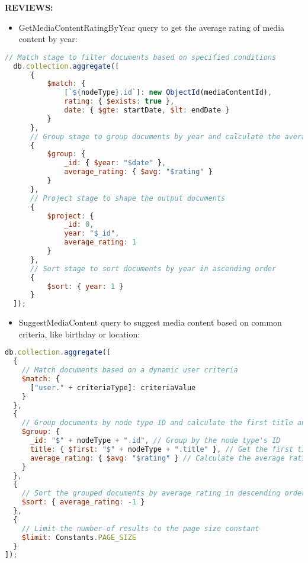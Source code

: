 \textbf{REVIEWS:}

\begin{itemize}
\item GetMediaContentRatingByYear query to get the average rating of media content by year:
\end{itemize}


\begin{lstlisting}[language=JavaScript, caption=GetMediaContentRatingByYear]
  // Match stage to filter documents based on specified conditions
  db.collection.aggregate([
      {
          $match: {
              [`${nodeType}.id`]: new ObjectId(mediaContentId),
              rating: { $exists: true },
              date: { $gte: startDate, $lt: endDate }
          }
      },
      // Group stage to group documents by year and calculate the average rating
      {
          $group: {
              _id: { $year: "$date" },
              average_rating: { $avg: "$rating" }
          }
      },
      // Project stage to shape the output documents
      {
          $project: {
              _id: 0,
              year: "$_id",
              average_rating: 1
          }
      },
      // Sort stage to sort documents by year in ascending order
      {
          $sort: { year: 1 }
      }
  ]);
  \end{lstlisting}


\begin{itemize}
  \item SuggestMediaContent query to suggest media content based on common criteria, like birthday or location:
  
\end{itemize}

\begin{lstlisting}[language=JavaScript, caption=SuggestMediaContent]
  db.collection.aggregate([
  {
    // Match documents based on a dynamic user criteria
    $match: {
      ["user." + criteriaType]: criteriaValue
    }
  },
  {
    // Group documents by node type ID and calculate the first title and average rating
    $group: {
      _id: "$" + nodeType + ".id", // Group by the node type's ID
      title: { $first: "$" + nodeType + ".title" }, // Get the first title in the group
      average_rating: { $avg: "$rating" } // Calculate the average rating for the group
    }
  },
  {
    // Sort the grouped documents by average rating in descending order
    $sort: { average_rating: -1 }
  },
  {
    // Limit the number of results to the page size constant
    $limit: Constants.PAGE_SIZE
  }
]);
\end{lstlisting}

